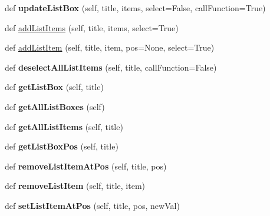 \begin{DoxyCompactItemize}
\item 
\mbox{\label{classappjar_1_1gui_aa5b648a2b89180e5c7e9f5b7b5f311bf}} 
def {\bfseries update\+List\+Box} (self, title, items, select=False, call\+Function=True)
\item 
def \hyperlink{classappjar_1_1gui_aa26a393c3ae78854d25281a198a8b67a}{add\+List\+Items} (self, title, items, select=True)
\item 
def \hyperlink{classappjar_1_1gui_aea7ae8939f18af91fc3e526becca0e96}{add\+List\+Item} (self, title, item, pos=None, select=True)
\item 
\mbox{\label{classappjar_1_1gui_a9c303ffea884ff6bdf330e1375d8d8be}} 
def {\bfseries deselect\+All\+List\+Items} (self, title, call\+Function=False)
\item 
\mbox{\label{classappjar_1_1gui_a6266e455fb9947064f36990417ab9e70}} 
def {\bfseries get\+List\+Box} (self, title)
\item 
\mbox{\label{classappjar_1_1gui_a49060682d1ba4a3280e565b61de1f029}} 
def {\bfseries get\+All\+List\+Boxes} (self)
\item 
\mbox{\label{classappjar_1_1gui_acb03df17b2a8e66033de6b8e041bc7ad}} 
def {\bfseries get\+All\+List\+Items} (self, title)
\item 
\mbox{\label{classappjar_1_1gui_a67cd78e21e6cccebaac30ff372472883}} 
def {\bfseries get\+List\+Box\+Pos} (self, title)
\item 
\mbox{\label{classappjar_1_1gui_ad3c7d894af8bec4554ed2661f0855093}} 
def {\bfseries remove\+List\+Item\+At\+Pos} (self, title, pos)
\item 
\mbox{\label{classappjar_1_1gui_a3a01681a2198d0eca6ad245b46181c41}} 
def {\bfseries remove\+List\+Item} (self, title, item)
\item 
\mbox{\label{classappjar_1_1gui_a1810c5744b707ca66a8fbfab674d53a7}} 
def {\bfseries set\+List\+Item\+At\+Pos} (self, title, pos, new\+Val)
\item 
\mbox{\label{classappjar_1_1gui_adc3141a48dac7a012b1774ee41cfd9ef}} 

\end{DoxyCompactItemize}
